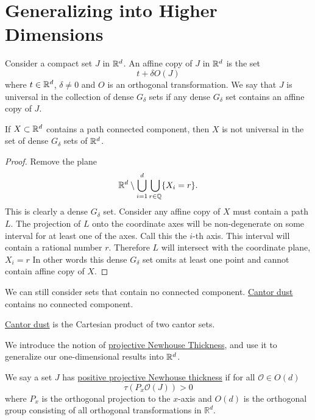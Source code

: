 \section{Generalizing into Higher Dimensions}

Consider a compact set $J$ in $\mathbb{R}^d$. An affine copy of $J$ in $\mathbb{R}^d$ is the set 
$$
t+\delta O (J)
$$
where $t\in \mathbb{R}^d$, $\delta\ne 0$ and $O$ is an orthogonal transformation. We say that $J$ is universal in the collection of dense $G_{\delta}$ sets if any dense $G_{\delta}$ set contains an affine copy of $J$. 
\begin{theorem}
    If $X\subset \mathbb{R}^d$ contains a path connected component, then $X$ is not universal in the set of dense $G_\delta$ sets of $\mathbb{R}^d$.  
\end{theorem}
\begin{proof}
    Remove the plane 
    $$
    \mathbb{R}^d \setminus \bigcup_{i=1}^d \bigcup_{r \in \mathbb{Q}} \{X_i = r \}.
    $$
    This is clearly a dense $G_{\delta}$ set. 
    Consider any affine copy of $X$ must contain a path $L$.   The projection of $L$ onto the coordinate axes will be non-degenerate on some interval for at least one of the axes.  Call this the $i$-th axis.  This interval will contain a rational number $r$.  Therefore $L$ will intersect with the coordinate plane, $X_i = r$ 
    In other words this dense $G_{\delta}$ set omits at least one point and cannot contain affine copy of $X$.  
\end{proof}
 We can still consider sets that contain no connected component.  \underline{Cantor dust} contains no connected component.  
 \begin{definition}
 \underline{Cantor dust} is the Cartesian product of two cantor sets.    
 \end{definition}
 
 We introduce the notion of \underline{projective Newhouse Thickness}, and use it to generalize our one-dimensional results into $\mathbb{R}^d$.  
\begin{definition}
    We say a set $J$ has \underline{positive projective Newhouse thickness} if for all ${\mathcal O} \in O(d)$ 
$$
 \tau(P_x{\mathcal O}(J)) > 0
$$
where $P_x$ is the orthogonal projection to the $x$-axis and $O(d)$ is the orthogonal group consisting of all orthogonal transformations in ${\mathbb R}^d$.  
\end{definition}

